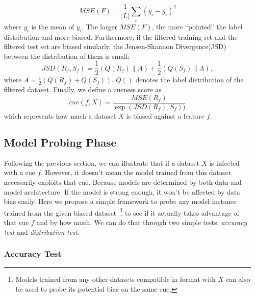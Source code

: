 \begin{equation}
MSE(F) = \frac{1}{|L|} \sum_i (y_i - \overline{y_i})^2
\end{equation}
where $\hat{y_i}$ is the mean of $y_i$. The larger $MSE(F)$, 
the more ``pointed'' the label distribution and more biased. 
Furthermore, if the filtered training set and 
the filtered test set are biased similarly,
the Jensen-Shannon Divergence(JSD)~\cite{lin1991divergence} between
the distribution of them is small:
\begin{equation}
JSD(R_f, S_f) = \frac{1}{2}\left (Q(R_f)\parallel A  \right )+\frac{1}{2}\left (Q(S_f)\parallel A  \right ), 
\end{equation}
where $ A = \frac{1}{2}\left (Q(R_f)+Q(S_f) \right )$. 
$Q()$ denotes the label distribution of the filtered dataset.
Finally, we define a cueness score as
\begin{equation}
cue(f, X) = \frac{MSE(R_f)}{\exp(JSD(R_f), S_f))}
\end{equation} 
which represents how much a dataset $X$ 
is biased against a feature $f$. 


\subsection{Model Probing Phase}
\label{sec:modelprobing}

Following the previous section, 
we can illustrate that if a dataset $X$ is infected with a cue $f$. 
However, it doesn't mean
the model trained from this dataset necessarily exploits that cue. 
Because models are determined by both data and model architecture. 
If the model is strong enough, it won't be affected by data bias easily. 
Here we propose a simple framework to probe any model instance trained from the
given biased dataset~\footnote{Models trained from any other 
datasets compatible in format with $X$ can also be used to probe its potential
bias on the same cue.} to see if it actually takes advantage of that cue $f$
and by how much. We can do that through two simple tests: 
{\em accuracy test} and {\em distribution test}. 

\subsubsection{Accuracy Test}
\label{sec:accuracytest}

